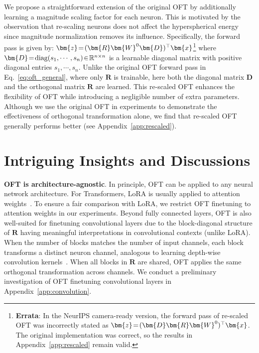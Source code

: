 We propose a straightforward extension of the original OFT by additionally learning a magnitude scaling factor for each neuron. This is motivated by the observation that re-scaling neurons does not affect the hyperspherical energy since magnitude normalization removes its influence. Specifically, the forward pass is given by: $\thickmuskip=2mu \medmuskip=2mu\bm{z}=(\bm{R}\bm{W}^0\bm{D})^\top\bm{x}$\footnote{\textbf{Errata}: In the NeurIPS camera-ready version, the forward pass of re-scaled OFT was incorrectly stated as $\thickmuskip=2mu \medmuskip=2mu\bm{z}=(\bm{D}\bm{R}\bm{W}^0)^\top\bm{x}$. The original implementation was correct, so the results in Appendix~\ref{app:rescaled} remain valid.} where $\thickmuskip=2mu \medmuskip=2mu \bm{D}=\text{diag}(s_1,\cdots,s_n)\in\mathbb{R}^{n\times n}$ is a learnable diagonal matrix with positive diagonal entries $s_1,\cdots,s_n$. Unlike the original OFT forward pass in Eq.~\eqref{eq:oft_general}, where only $\bm{R}$ is trainable, here both the diagonal matrix $\bm{D}$ and the orthogonal matrix $\bm{R}$ are learned. This re-scaled OFT enhances the flexibility of OFT while introducing a negligible number of extra parameters. Although we use the original OFT in experiments to demonstrate the effectiveness of orthogonal transformation alone, we find that re-scaled OFT generally performs better (see Appendix~\ref{app:rescaled}).

\section{Intriguing Insights and Discussions}

\textbf{OFT is architecture-agnostic}. In principle, OFT can be applied to any neural network architecture. For Transformers, LoRA is usually applied to attention weights~\cite{hulora2022}. To ensure a fair comparison with LoRA, we restrict OFT finetuning to attention weights in our experiments. Beyond fully connected layers, OFT is also well-suited for finetuning convolutional layers due to the block-diagonal structure of $\bm{R}$ having meaningful interpretations in convolutional contexts (unlike LoRA). When the number of blocks matches the number of input channels, each block transforms a distinct neuron channel, analogous to learning depth-wise convolution kernels~\cite{chollet2017xception}. When all blocks in $\bm{R}$ are shared, OFT applies the same orthogonal transformation across channels. We conduct a preliminary investigation of OFT finetuning convolutional layers in Appendix~\ref{app:convolution}.

